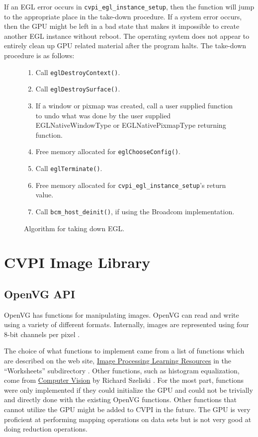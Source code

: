 \documentclass[12pt]{report}
\begin{document}
If an EGL error occurs in {\tt cvpi\_egl\_instance\_setup}, then the
function will jump to the appropriate place in the take-down
procedure. If a system error occurs, then the GPU might be left in a
bad state that makes it impossible to create another EGL instance
without reboot. The operating system does not appear to entirely clean
up GPU related material after the program halts. The take-down
procedure is as follows:
\begin{figure}[H]
\begin{mdframed}[style=default]
\begin{enumerate}
\item Call {\tt eglDestroyContext()}.
\item Call {\tt eglDestroySurface()}.
\item If a window or pixmap was created, call a user supplied
function to undo what was done by the user supplied
EGLNativeWindowType or EGLNativePixmapType returning function.
\item Free memory allocated for {\tt eglChooseConfig()}.
\item Call {\tt eglTerminate()}.
\item Free memory allocated for {\tt cvpi\_egl\_instance\_setup}'s
  return value.
\item Call {\tt bcm\_host\_deinit()}, if using the Broadcom implementation.
\end{enumerate}
\end{mdframed}
\caption{Algorithm for taking down EGL.}
\end{figure}
\chapter{CVPI Image Library}
\label{sec-3}
\section{OpenVG API}
\label{sec-3-1}
OpenVG has functions for manipulating images. OpenVG can read and
write using a variety of different formats. Internally, images are
represented using four 8-bit channels per pixel \cite{openvg}.

The choice of what functions to implement came from a list of
functions which are described on the web site, \underline{Image
  Processing Learning Resources} in the ``Worksheets'' subdirectory
\cite{HIPR2}. Other functions, such as histogram equalization, come
from \underline{Computer Vision} by Richard Szeliski
\cite{Szeliski}. For the most part, functions were only implemented if
they could initialize the GPU and could not be trivially and directly
done with the existing OpenVG functions. Other functions that cannot
utilize the GPU might be added to CVPI in the future. The GPU is very
proficient at performing mapping operations on data sets but is not
very good at doing reduction operations.
\end{document}
